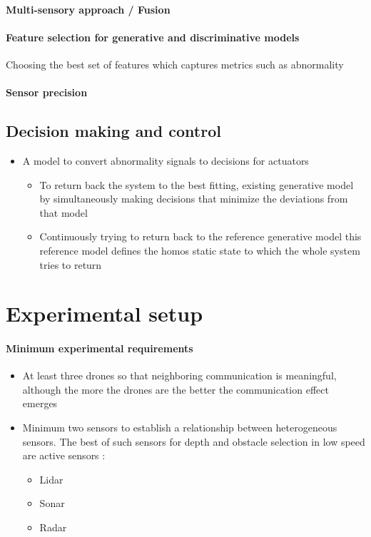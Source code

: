 \documentclass{article}
\begin{document}
			\paragraph{Multi-sensory approach / Fusion}
			
			\paragraph{Feature selection for generative and discriminative models}
			Choosing the best set of features which captures metrics such as abnormality
			
			\paragraph{Sensor precision} 
			
		\subsection{Decision making and control}
			\begin{itemize}
				\item A model to convert abnormality signals to decisions for actuators
				\begin{itemize}
					\item To return back the system to the best fitting, existing generative model by simultaneously making decisions that minimize the deviations from that model
					\item Continuously trying to return back to the reference generative model this reference model defines the homos static state to which the whole system tries to return 
				\end{itemize}
			\end{itemize}
	\section{Experimental setup} \label{experimental-setup}
		\paragraph{Minimum experimental requirements}
			\begin{itemize}
				\item At least three drones so that neighboring communication is meaningful, although the more the drones are the better the communication effect emerges
				\item Minimum two sensors to establish a relationship between heterogeneous sensors. The best of such sensors for depth and obstacle selection in low speed are active sensors \citep{apatean-2007-sensors-for-obstacle-detection-a-survey}: 
			  	\begin{itemize}
					\item Lidar
					\item Sonar
					\item Radar
			  	\end{itemize}
		  	\end{itemize}
\end{document}
